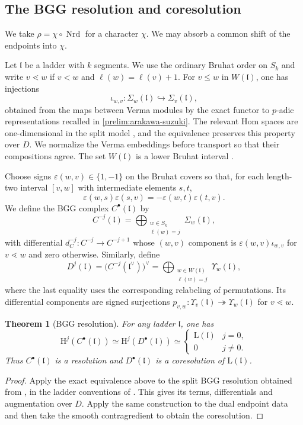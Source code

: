 \documentclass[10pt,a4paper]{article}
\newtheorem{theorem}{Theorem}[section]
\theoremstyle{definition}
\theoremstyle{remark}
\numberwithin{equation}{section}
\newcommand{\fl}{\mathfrak{l}}
\newcommand{\Lrep}{\mathrm{L}}
\newcommand{\bC}{C}
\newcommand{\bD}{D}
\newcommand{\hra}{\hookrightarrow}
\newcommand{\sra}{\twoheadrightarrow}
\begin{document}
\subsection{The BGG resolution and coresolution}\label{gl:line-transport}

We take $\rho=\chi\circ\operatorname{Nrd}$ for a character $\chi$.
We may absorb a common shift of the endpoints into $\chi$.

Let $\fl$ be a ladder with $k$ segments. We use the ordinary Bruhat order
on $S_k$ and write $v\lessdot w$ if $v<w$ and $\ell(w)=\ell(v)+1$.
For $v\leq w$ in $W(\fl)$, one has injections
\[
 \iota_{w,v}:\Sigma_w(\fl)\hra \Sigma_v(\fl),
\]
obtained from the maps between Verma modules by the exact functor to
$p$-adic representations recalled in \cref{prelim:arakawa-suzuki}.
The relevant Hom spaces are one-dimensional in the split model
\cite[Proposition~4.3.6]{EmertonHelm2014}, and the equivalence
preserves this property over $D$. We normalize the Verma embeddings
before transport so that their compositions agree.
The set $W(\fl)$ is
a lower Bruhat interval \cite[Lemma~15]{LM2014}.

Choose signs $\varepsilon(w,v)\in\{1,-1\}$ on the Bruhat covers so that, for
each length-two interval $[v,w]$ with intermediate elements $s,t$,
\[
 \varepsilon(w,s)\varepsilon(s,v)
 =-\varepsilon(w,t)\varepsilon(t,v).
\]
We define the BGG complex $\bC^\bullet(\fl)$ by
\[
 \bC^{-j}(\fl)=\bigoplus_{\substack{w\in S_k\\\ell(w)=j}}\Sigma_w(\fl),
\]
with differential $d_C^{-j}:\bC^{-j}\longrightarrow\bC^{-j+1}$ whose
$(w,v)$ component is $\varepsilon(w,v)\iota_{w,v}$ for $v\lessdot w$
and zero otherwise. Similarly, define
\[
 \bD^j(\fl)=\bigl(\bC^{-j}(\fl^\vee)\bigr)^\vee
 =\bigoplus_{\substack{w\in W(\fl)\\\ell(w)=j}}\Upsilon_w(\fl),
\]
where the last equality uses the corresponding relabeling of permutations.
Its differential components are signed surjections
$p_{v,w}:\Upsilon_v(\fl)\sra \Upsilon_w(\fl)$ for $v\lessdot w$.

\begin{theorem}[BGG resolution]\label{thm:bgg}
For any ladder $\fl$, one has
\[
 \mathrm{H}^j(\bC^\bullet(\fl))\simeq \mathrm{H}^j(\bD^\bullet(\fl))\simeq
 \begin{cases}\Lrep(\fl)&j=0,\\0&j\ne0.\end{cases}
\]
Thus $\bC^\bullet(\fl)$ is a resolution and $\bD^\bullet(\fl)$ is a
coresolution of $\Lrep(\fl)$.
\end{theorem}
\begin{proof}
Apply the exact equivalence above to the split BGG resolution
obtained from \cite[Theorem~5.1.1]{Suzuki1998}, in the ladder
conventions of \cite[\S4]{BC2015}. This gives its terms, differentials and
augmentation over $D$. Apply the same construction to the dual
endpoint data and then take the smooth contragredient to obtain the
coresolution.
\end{proof}
\end{document}
